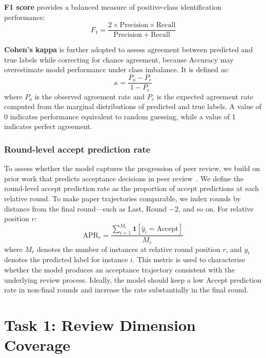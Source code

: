 \documentclass[preprint,10pt,times]{elsarticle}
\begin{document}
\textbf{F1 score} provides a balanced measure of positive-class identification performance:
\begin{equation}
  F_1 = \frac{2 \times \mathrm{Precision} \times \mathrm{Recall}}{\mathrm{Precision} + \mathrm{Recall}}
  \label{eq:f1}
\end{equation}

\textbf{Cohen's kappa} is further adopted to assess agreement between predicted and true labels while correcting for chance agreement, because Accuracy may overestimate model performance under class imbalance. It is defined as:
\begin{equation}
  \kappa = \frac{P_o - P_e}{1 - P_e}
  \label{eq:kappa}
\end{equation}
where $P_o$ is the observed agreement rate and $P_e$ is the expected agreement rate computed from the marginal distributions of predicted and true labels. A value of 0 indicates performance equivalent to random guessing, while a value of 1 indicates perfect agreement.

\subsubsection{Round-level accept prediction rate}

To assess whether the model captures the progression of peer review, we build on prior work that predicts acceptance decisions in peer review~\cite{ref40}. We define the round-level accept prediction rate as the proportion of accept predictions at each relative round. To make paper trajectories comparable, we index rounds by distance from the final round---such as Last, Round $-2$, and so on. For relative position $r$:
\begin{equation}
  \mathrm{APR}_r = \frac{\sum_{i=1}^{M_r} \mathbf{1}[\hat{y}_i = \mathrm{Accept}]}{M_r}
  \label{eq:accept-rate}
\end{equation}
where $M_r$ denotes the number of instances at relative round position $r$, and $\hat{y}_i$ denotes the predicted label for instance $i$. This metric is used to characterise whether the model produces an acceptance trajectory consistent with the underlying review process. Ideally, the model should keep a low Accept prediction rate in non-final rounds and increase the rate substantially in the final round.

\section{Task 1: Review Dimension Coverage}
\label{sec:task1}
\end{document}
